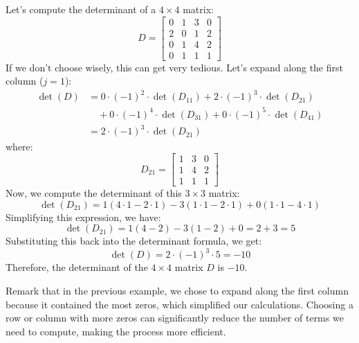 \begin{eg}
    Let's compute the determinant of a $4 \times 4$ matrix:
    \[
        D = \begin{bmatrix}
            0 & 1 & 3 & 0 \\
            2 & 0 & 1 & 2 \\
            0 & 1 & 4 & 2 \\
            0 & 1 & 1 & 1
        \end{bmatrix}
    \]
    If we don't choose wisely, this can get very tedious. Let's expand along the first column (\(j = 1\)):
    \begin{align*}
        \det(D) &= 0 \cdot (-1)^{2} \cdot \det(D_{11}) + 2 \cdot (-1)^{3} \cdot \det(D_{21}) \\
        &\quad + 0 \cdot (-1)^{4} \cdot \det(D_{31}) + 0 \cdot (-1)^{5} \cdot \det(D_{41}) \\
        &= 2 \cdot (-1)^{3} \cdot \det(D_{21})
    \end{align*}
    where:
    \[
        D_{21} = \begin{bmatrix}
            1 & 3 & 0 \\
            1 & 4 & 2 \\
            1 & 1 & 1
        \end{bmatrix}
    \]
    Now, we compute the determinant of this \(3 \times 3\) matrix:
    \[
        \det(D_{21}) = 1(4 \cdot 1 - 2 \cdot 1) - 3(1 \cdot 1 - 2 \cdot 1) + 0(1 \cdot 1 - 4 \cdot 1)
    \]
    Simplifying this expression, we have:
    \[
        \det(D_{21}) = 1(4 - 2) - 3(1 - 2) + 0 = 2 + 3 = 5
    \]
    Substituting this back into the determinant formula, we get:
    \[
        \det(D) = 2 \cdot (-1)^{3} \cdot 5 = -10
    \]
    Therefore, the determinant of the \(4 \times 4\) matrix \(D\) is \(-10\).
\end{eg}
Remark that in the previous example, we chose to expand along the first column because it contained the most zeros, which simplified our calculations. Choosing a row or column with more zeros can significantly reduce the number of terms we need to compute, making the process more efficient.

